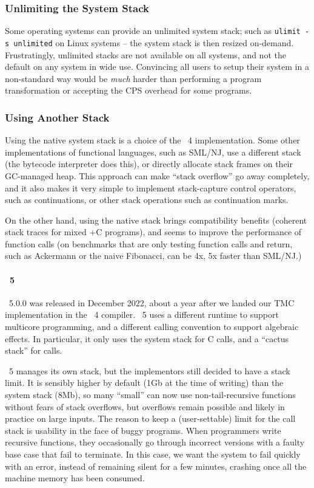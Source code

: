 \subsubsection{Unlimiting the System Stack}

Some operating systems can provide an unlimited system stack; such as \texttt{ulimit -s unlimited} on Linux systems -- the system stack is then resized on-demand.
Frustratingly, unlimited stacks are not available on all systems, and not the default on any system in wide use.
Convincing all users to setup their system in a non-standard way would be \emph{much} harder than performing a program transformation or accepting the CPS overhead for some programs.

\subsubsection{Using Another Stack}

Using the native system stack is a choice of the \OCaml~4 implementation.
Some other implementations of functional languages, such as SML/NJ, use a different stack (the \OCaml bytecode interpreter does this), or directly allocate stack frames on their GC-managed heap.
This approach can make ``stack overflow'' go away completely, and it also makes it very simple to implement stack-capture control operators, such as continuations, or other stack operations such as continuation marks.

On the other hand, using the native stack brings compatibility benefits (coherent stack traces for mixed \OCaml+C programs), and seems to improve the performance of function calls (on benchmarks that are only testing function calls and return, such as Ackermann or the naive Fibonacci, \OCaml can be 4x, 5x faster than SML/NJ.)

\paragraph{\OCaml~5}

\OCaml~5.0.0 was released in December 2022, about a year after we landed our TMC implementation in the \OCaml~4 compiler.
\OCaml~5 uses a different runtime to support multicore programming, and a different calling convention to support algebraic effects.
In particular, it only uses the system stack for C calls, and a ``cactus stack'' for \OCaml calls.

\OCaml~5 manages its own stack, but the implementors still decided to have a stack limit.
It is sensibly higher by default (1Gb at the time of writing) than the system stack (8Mb), so many ``small'' can now use non-tail-recursive functions without fears of stack overflows, but overflows remain possible and likely in practice on large inputs.
The reason to keep a (user-settable) limit for the \OCaml call stack is usability in the face of buggy programs.
When programmers write recursive functions, they occasionally go through incorrect versions with a faulty base case that fail to terminate.
In this case, we want the system to fail quickly with an error, instead of remaining silent for a few minutes, crashing once all the machine memory has been consumed.

